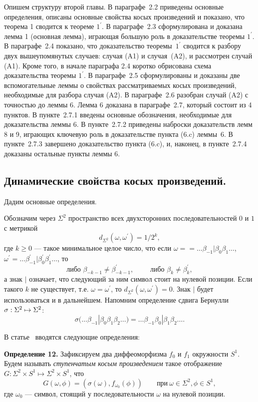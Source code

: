 \documentclass[12pt]{article}
\begin{document}
Опишем структуру второй главы. В параграфе~2.2 приведены основные определения, описаны основные свойства косых произведений и показано, что теорема 1 сводится к теореме $1^{\prime}$. В параграфе~2.3 сформулирована и доказана лемма 1 (основная лемма), играющая большую роль в доказательстве теоремы $1^{\prime}$. В параграфе~2.4 показано, что доказательство теоремы~$1^{\prime}$ сводится к разбору двух вышеупомянутых случаев: случая (A1) и случая~(A2), и рассмотрен случай (A1). Кроме того, в начале параграфа 2.4 коротко обрисована схема доказательства теоремы $1^{\prime}$. В параграфе~2.5 сформулированы и доказаны две вспомогательные леммы о свойствах рассматриваемых косых произведений, необходимые для разбора случая (A2). В параграфе~2.6 разобран случай (A2) с точностью до леммы 6. Лемма 6 доказана в параграфе~2.7, который состоит из 4 пунктов. В пункте~2.7.1 введены основные обозначения, необходимые для доказательства леммы 6. В пункте~2.7.2 приведены наброски доказательств лемм 8 и 9, играющих ключевую роль в доказательстве пункта (6.c) леммы~6. В пункте~2.7.3 завершено доказательство пункта (6.c), и, наконец, в пункте~2.7.4 доказаны остальные пункты леммы 6. 

\subsection{Динамические свойства косых произведений.}

Дадим основные определения.
 
Обозначим через $\Sigma^2$ пространство всех двухсторонних последовательностей $0$ и $1$ с метрикой
$$d_{\Sigma^2}(\omega,\omega^{\prime})=1/2^{k},$$
где $k\geq0$ --- такое минимальное целое число, что если $\omega=\allowbreak=\ldots\beta_{-1}|\beta_0\beta_1\ldots$, $\omega^{\prime}=\ldots\beta_{-1}^{\prime}|\beta_0^{\prime}\beta_1^{\prime}\ldots$, то 
$$\mbox{либо }\beta_{-k-1}\neq\beta_{-k-1}^{\prime},\qquad\mbox{ либо }\beta_{k}\neq\beta_{k}^{\prime},$$
а знак $|$ означает, что следующий за ним символ стоит на нулевой позиции. 
Если такого $k$ не существует, т.е. $\omega=\omega^{\prime}$, то $d_{\Sigma^2}(\omega,\omega^{\prime})=0$.
Знак $|$ будет использоваться и в дальнейшем.
Напомним определение сдвига Бернулли $\sigma\nobreak:\nobreak\Sigma^2\mapsto\Sigma^2$:
$$\sigma(\ldots\beta_{-1}|\beta_0\beta_1\beta_2\ldots)=\ldots\beta_{-1}\beta_0|\beta_1\beta_2\ldots.$$

В статье~\cite{15} вводятся следующие определения:   

\textbf{Определение 12.} Зафиксируем два диффеоморфизма $f_0$ и $f_1$ окружности $S^1$. Будем называть \textit{ступенчатым косым произведением} такое отображение $G:\Sigma^2\times S^1\mapsto\Sigma^2\times S^1$, что
$$G(\omega,\phi)=(\sigma(\omega), f_{\omega_0}(\phi))\qquad\mbox{при}\ \omega\in\Sigma^2,\phi\in S^1,$$
где $\omega_0$ --- символ, стоящий у последовательности $\omega$ на нулевой позиции.
\end{document}
